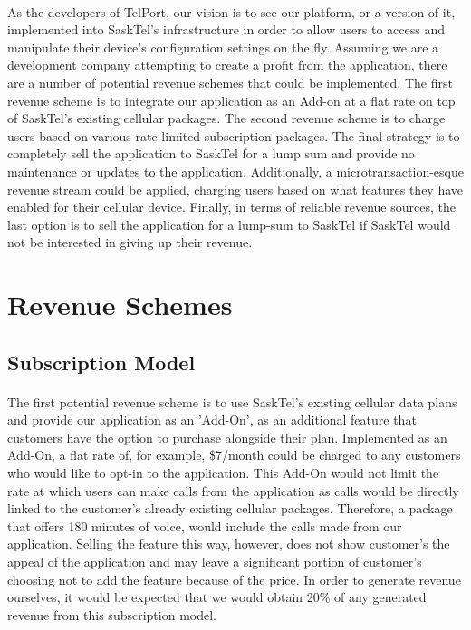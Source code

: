 \documentclass[12pt]{article}
\begin{document}
\paragraph{}
As the developers of TelPort, our vision is to see our platform, or a version of it, implemented into SaskTel’s infrastructure in order to allow users to access and manipulate their device’s configuration settings on the fly. Assuming we are a development company attempting to create a profit from the application, there are a number of potential revenue schemes that could be implemented.  The first revenue scheme is to integrate our application as an Add-on at a flat rate on top of SaskTel’s existing cellular packages. The second revenue scheme is to charge users based on various rate-limited subscription packages. The final strategy is to completely sell the application to SaskTel for a lump sum and provide no maintenance or updates to the application. Additionally, a microtransaction-esque revenue stream could be applied, charging users based on what features they have enabled for their cellular device. Finally, in terms of reliable revenue sources, the last option is to sell the application for a lump-sum to SaskTel if SaskTel would not be interested in giving up their revenue.

\section{Revenue Schemes}
\subsection{Subscription Model}
\paragraph{}
The first potential revenue scheme is to use SaskTel's existing cellular data plans and provide our application as an 'Add-On', as an additional feature that customers have the option to purchase alongside their plan. Implemented as an Add-On, a flat rate of, for example, \$7/month could be charged to any customers who would like to opt-in to the application. This Add-On would not limit the rate at which users can make calls from the application as calls would be directly linked to the customer's already existing cellular packages. Therefore, a package that offers 180 minutes of voice, would include the calls made from our application. Selling the feature this way, however, does not show customer's the appeal of the application and may leave a significant portion of customer's choosing not to add the feature because of the price. In order to generate revenue ourselves, it would be expected that we would obtain 20\% of any generated revenue from this subscription model.
\end{document}

